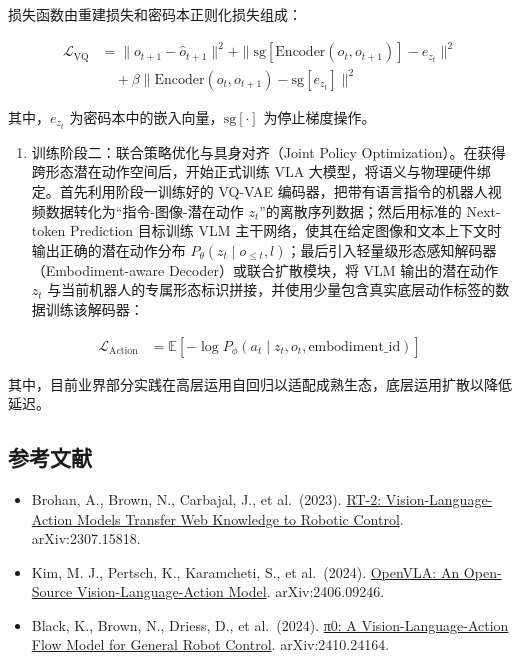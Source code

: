 损失函数由重建损失和密码本正则化损失组成：

\[
\begin{aligned}
\mathcal{L}_{\mathrm{VQ}}
&= \|o_{t+1}-\hat{o}_{t+1}\|^2
+\|\mathrm{sg}[\mathrm{Encoder}(o_t,o_{t+1})]-e_{z_t}\|^2
\\
&\quad+
\beta\|\mathrm{Encoder}(o_t,o_{t+1})-\mathrm{sg}[e_{z_t}]\|^2
\end{aligned}
\]

其中，\(e_{z_t}\) 为密码本中的嵌入向量，\(\mathrm{sg}[\cdot]\) 为停止梯度操作。

\begin{enumerate}
\def\labelenumi{\arabic{enumi}.}
\setcounter{enumi}{1}
\tightlist
\item
  训练阶段二：联合策略优化与具身对齐（Joint Policy Optimization）。在获得跨形态潜在动作空间后，开始正式训练 VLA 大模型，将语义与物理硬件绑定。首先利用阶段一训练好的 VQ-VAE 编码器，把带有语言指令的机器人视频数据转化为``指令-图像-潜在动作 \(z_t\)''的离散序列数据；然后用标准的 Next-token Prediction 目标训练 VLM 主干网络，使其在给定图像和文本上下文时输出正确的潜在动作分布 \(P_\theta(z_t\mid o_{\le t},l)\)；最后引入轻量级形态感知解码器（Embodiment-aware Decoder）或联合扩散模块，将 VLM 输出的潜在动作 \(z_t\) 与当前机器人的专属形态标识拼接，并使用少量包含真实底层动作标签的数据训练该解码器：
\end{enumerate}

\[
\begin{aligned}
\mathcal{L}_{\mathrm{Action}}
&=
\mathbb{E}\left[
-\log P_\phi(a_t\mid z_t,o_t,\text{embodiment\_id})
\right]
\end{aligned}
\]

其中，目前业界部分实践在高层运用自回归以适配成熟生态，底层运用扩散以降低延迟。

\hypertarget{ux53c2ux8003ux6587ux732e-174}{%
\subsection{参考文献}\label{ux53c2ux8003ux6587ux732e-174}}

\begin{itemize}
\tightlist
\item
  Brohan, A., Brown, N., Carbajal, J., et al.~(2023). \href{https://arxiv.org/abs/2307.15818}{RT-2: Vision-Language-Action Models Transfer Web Knowledge to Robotic Control}. arXiv:2307.15818.
\item
  Kim, M. J., Pertsch, K., Karamcheti, S., et al.~(2024). \href{https://arxiv.org/abs/2406.09246}{OpenVLA: An Open-Source Vision-Language-Action Model}. arXiv:2406.09246.
\item
  Black, K., Brown, N., Driess, D., et al.~(2024). \href{https://arxiv.org/abs/2410.24164}{π0: A Vision-Language-Action Flow Model for General Robot Control}. arXiv:2410.24164.
\end{itemize}

